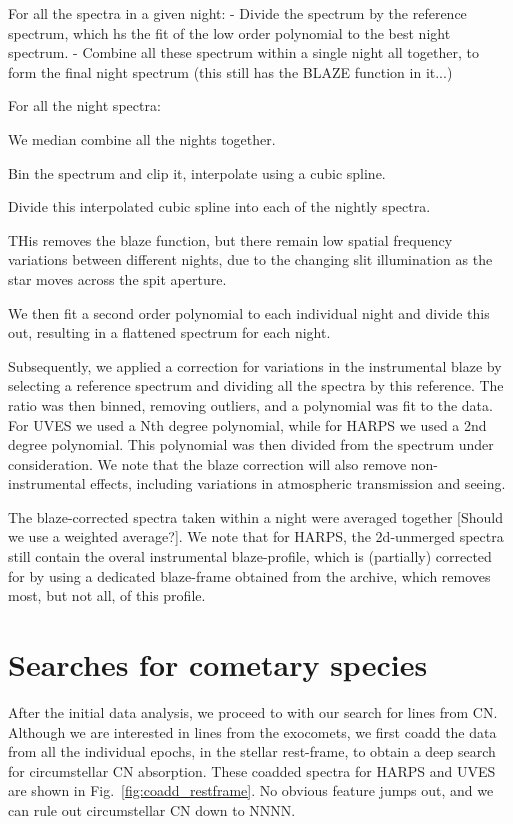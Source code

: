 \documentclass{aa}
\begin{document}
For all the spectra in a given night:
 - Divide the spectrum by the reference spectrum, which hs the fit of the low order polynomial to the best night spectrum.
 - Combine all these spectrum within a single night all together, to form the final night spectrum (this still has the BLAZE function in it...)

 For all the night spectra:

 We median combine all the nights together.

 Bin the spectrum and clip it, interpolate using a cubic spline.


 Divide this interpolated cubic spline into each of the nightly spectra.


THis removes the blaze function, but there remain low spatial frequency variations between different nights, due to the changing slit illumination as the star moves across the spit aperture.

We then fit a second order polynomial to each individual night and divide this out, resulting in a flattened spectrum for each night.


Subsequently, we applied a correction for variations in the instrumental blaze by selecting a reference spectrum and dividing all the spectra by this reference. The ratio was then binned, removing outliers, and a polynomial was fit to the data. For UVES we used a Nth degree polynomial, while for HARPS we used a 2nd degree polynomial. This polynomial was then divided from the spectrum under consideration. We note that the blaze correction will also remove non-instrumental effects, including variations in atmospheric transmission and seeing.

The blaze-corrected spectra taken within a night were averaged together [Should we use a weighted average?]. We note that for HARPS, the 2d-unmerged spectra still contain the overal instrumental blaze-profile, which is (partially) corrected for by using a dedicated blaze-frame obtained from the archive, which removes most, but not all, of this profile. 

\section{Searches for cometary species}
After the initial data analysis, we proceed to with our search for lines from CN. Although we are interested in lines from the exocomets, we first coadd the data from all the individual epochs, in the stellar rest-frame, to obtain a deep search for circumstellar CN absorption. These coadded spectra for HARPS and UVES are shown in Fig.~\ref{fig:coadd_restframe}. No obvious feature jumps out, and we can rule out circumstellar CN down to NNNN.
\end{document}
